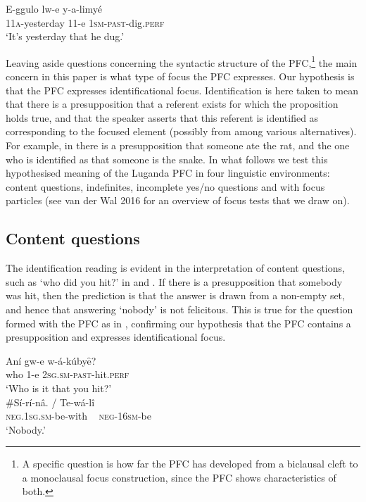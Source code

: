 \documentclass[output=paper]{langsci/langscibook}
\begin{document}
\ea\label{ex:vanderwal:11}
\gll E-ggulo    lw-e  y-a-limyé\\
     11\textsc{a}-yesterday  11-e  \textsc{1sm}-\textsc{past}-dig.\textsc{perf}\\
\glt ‘It’s yesterday that he dug.’
\z

Leaving aside questions concerning the syntactic structure of the PFC,\footnote{A specific question is how far the PFC has developed from a biclausal cleft to a monoclausal focus construction, since the PFC shows characteristics of both.}{} the main concern in this paper is what type of focus the PFC expresses. Our hypothesis is that the PFC expresses identificational focus. Identification is here taken to mean that there is a presupposition that a referent exists for which the proposition holds true, and that the speaker asserts that this referent is identified as corresponding to the focused element (possibly from among various alternatives). For example, in  there is a presupposition that someone ate the rat, and the one who is identified as that someone is the snake. In what follows we test this hypothesised meaning of the Luganda PFC in four linguistic environments: content questions, indefinites, incomplete yes/no questions and with focus particles (see van der Wal 2016 for an overview of focus tests that we draw on).

\subsection{Content questions}\label{sec:vanderwal:3.1} %

The identification reading is evident in the interpretation of content questions, such as ‘who did you hit?’ in  and . If there is a presupposition that somebody was hit, then the prediction is that the answer is drawn from a non-empty set, and hence that answering ‘nobody’ is not felicitous. This is true for the question formed with the PFC as in , confirming our hypothesis that the PFC contains a presupposition and expresses identificational focus. 

\ea\label{ex:vanderwal:12}
\gll Aní  gw-e  w-á-kúbyȇ?\\
     who  1-e  \textsc{2sg.sm-past}-hit.\textsc{perf}\\
\glt ‘Who is it that you hit?’\\{}
\gll \#Sí-rí-nâ.    /  Te-wá-lî\\
     \textsc{neg.1sg.sm}-be-with   ~ \textsc{neg-16sm}-be\\
\glt ‘Nobody.’
\z
\end{document}
